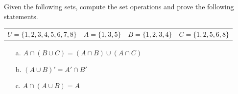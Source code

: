 \documentclass[a4paper,12pt]{book}
\newcounter{question}
\begin{document}
        \notonkey{ \newpage }{ \hrulefill }

        \begin{questionNOGRADE}{\thequestion}

            Given the following sets, compute the set operations and prove
            the following statements.

            \begin{tabular}{l l l l}
                $U = \{1, 2, 3, 4, 5, 6, 7, 8 \} $ &
                $A = \{1, 3, 5\}$ &
                $B = \{1, 2, 3, 4\}$ &
                $C = \{1, 2, 5, 6, 8\}$
            \end{tabular}

            \begin{enumerate}
                \item[a.]   $A \cap (B \cup C) = (A \cap B) \cup (A \cap C)$

                \item[b.]   $(A \cup B)' = A' \cap B'$

                \item[c.]   $A \cap (A \cup B) = A$
            \end{enumerate}

        \end{questionNOGRADE}
\end{document}
